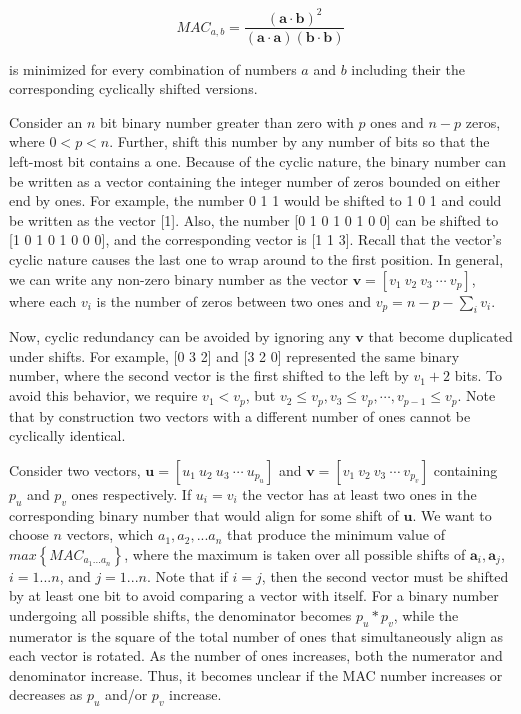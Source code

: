 \documentclass[3p,times]{elsarticle}
\begin{document}
\begin{equation}
MAC_{a,b}=\frac{\left(\mathbf{a}\cdot\mathbf{b}\right)^2}{\left(\mathbf{a}\cdot\mathbf{a}\right)\left(\mathbf{b}\cdot\mathbf{b}\right)}
\end{equation}

is minimized for every combination of numbers $a$ and $b$ including their the corresponding cyclically shifted versions.

Consider an $n$ bit binary number greater than zero with $p$ ones and $n-p$ zeros, where $0<p<n$.  
Further, shift this number by any number of bits so that the left-most bit contains a one.  
Because of the cyclic nature, the binary number can be written as a vector containing the integer number of zeros bounded on either end by ones.  
For example, the number 0 1 1 would be shifted to 1 0 1 and could be written as the vector [1].  
Also, the number [0 1 0 1 0 1 0 0] can be shifted to [1 0 1 0 1 0 0 0], and the corresponding vector is [1 1 3].  
Recall that the vector's cyclic nature causes the last one to wrap around to the first 
position.  
In general, we can write any non-zero binary number as the vector $\textbf{v}=\left[v_1\ v_2\ v_3\ \cdots\ v_p\right]$, where each $v_i$ is the number of zeros between two ones and $v_p=n-p-\sum\limits_{i} v_i$.  

Now, cyclic redundancy can be avoided by ignoring any $\textbf{v}$ that become duplicated under shifts.  
For example, [0 3 2] and [3 2 0] represented the same binary number, where the second vector is the first shifted to the left by $v_1+2$ bits.  
To avoid this behavior, we require $v_{1}<v_p$, but $v_2\le v_p, v_3\le v_p, \cdots, v_{p-1}\le v_p$.  
Note that by construction two vectors with a different number of ones cannot be cyclically identical.

Consider two vectors, $\textbf{u}=\left[u_1\ u_2\ u_3\ \cdots\ u_{p_u}\right]$ and $\textbf{v}=\left[v_1\ v_2\ v_3\ \cdots\ v_{p_v}\right]$ containing $p_u$ and $p_v$ ones respectively.  
If $u_i=v_i$ the vector has at least two ones in the corresponding binary number that would align for some shift of $\textbf{u}$.  
We want to choose $n$ vectors, which $a_1, a_2, ... a_n$ that produce the minimum value of $max\left\{MAC_{a_1...a_n}\right\}$, where the maximum is taken over all possible shifts of $\textbf{a}_i, \textbf{a}_j$, $i=1...n$, and $j=1...n$.  
Note that if $i=j$, then the second vector must be shifted by at least one bit to avoid comparing a vector with itself.  
For a binary number undergoing all possible shifts, the denominator becomes $p_u * p_v$, while the numerator is the square of the total number of ones that simultaneously align as each vector is rotated.  
As the number of ones increases, both the numerator and denominator increase.   
Thus, it becomes unclear if the MAC number increases or decreases as $p_u$ and/or $p_v$ increase.
\end{document}
